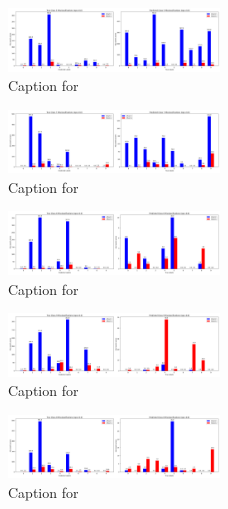 \documentclass[12pt, a4paper]{article}
\begin{document}
\begin{figure}[ht]
\centering
\includegraphics[width=0.5\textwidth]{combined_class_boundary_pgd/combined_class_5_misclassifications_eps_0.6.png}
\caption{Caption for }
\label{fig:combined_class_5_misclassifications_eps_0.6.png}
\end{figure}

\begin{figure}[ht]
\centering
\includegraphics[width=0.5\textwidth]{combined_class_boundary_pgd/combined_class_7_misclassifications_eps_0.6.png}
\caption{Caption for }
\label{fig:combined_class_7_misclassifications_eps_0.6.png}
\end{figure}

\begin{figure}[ht]
\centering
\includegraphics[width=0.5\textwidth]{combined_class_boundary_pgd/combined_class_6_misclassifications_eps_0.6.png}
\caption{Caption for }
\label{fig:combined_class_6_misclassifications_eps_0.6.png}
\end{figure}

\begin{figure}[ht]
\centering
\includegraphics[width=0.5\textwidth]{combined_class_boundary_pgd/combined_class_9_misclassifications_eps_0.6.png}
\caption{Caption for }
\label{fig:combined_class_9_misclassifications_eps_0.6.png}
\end{figure}

\begin{figure}[ht]
\centering
\includegraphics[width=0.5\textwidth]{combined_class_boundary_pgd/combined_class_8_misclassifications_eps_0.6.png}
\caption{Caption for }
\label{fig:combined_class_8_misclassifications_eps_0.6.png}
\end{figure}
\end{document}
